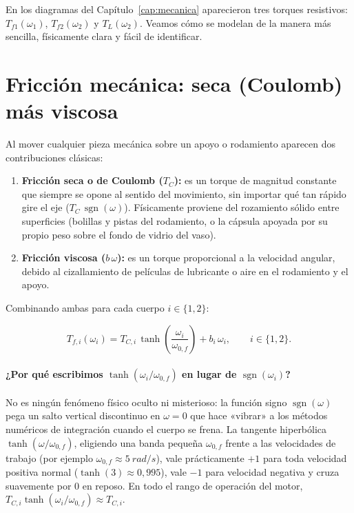 \documentclass[11pt,a4paper,oneside]{book}
\newcommand{\sgn}{\operatorname{sgn}}
\begin{document}
En los diagramas del Capítulo~\ref{cap:mecanica} aparecieron tres torques
resistivos: $T_{f1}(\omega_1)$, $T_{f2}(\omega_2)$ y $T_L(\omega_2)$. Veamos
cómo se modelan de la manera más sencilla, físicamente clara y fácil de
identificar.

\section{Fricción mecánica: seca (Coulomb) más viscosa}

Al mover cualquier pieza mecánica sobre un apoyo o rodamiento aparecen dos
contribuciones clásicas:
\begin{enumerate}
  \item \textbf{Fricción seca o de Coulomb ($T_C$):} es un torque de magnitud
        constante que siempre se opone al sentido del movimiento, sin importar
        qué tan rápido gire el eje ($T_C\,\sgn(\omega)$). Físicamente proviene
        del rozamiento sólido entre superficies (bolillas y pistas del
        rodamiento, o la cápsula apoyada por su propio peso sobre el fondo de
        vidrio del vaso).
  \item \textbf{Fricción viscosa ($b\,\omega$):} es un torque proporcional a la
        velocidad angular, debido al cizallamiento de películas de lubricante o
        aire en el rodamiento y el apoyo.
\end{enumerate}

Combinando ambas para cada cuerpo $i \in \{1, 2\}$:
\begin{ecuacionclave}
\begin{equation}
  T_{f,i}(\omega_i) = T_{C,i}\,\tanh\!\left(\frac{\omega_i}{\omega_{0,f}}\right) + b_i\,\omega_i,
  \qquad i \in \{1, 2\}.
  \label{eq:friccion_cap4}
\end{equation}
\end{ecuacionclave}

\paragraph{¿Por qué escribimos $\tanh(\omega_i/\omega_{0,f})$ en lugar de $\sgn(\omega_i)$?}
No es ningún fenómeno físico oculto ni misterioso: la función signo $\sgn(\omega)$
pega un salto vertical discontinuo en $\omega = 0$ que hace «vibrar» a los
métodos numéricos de integración cuando el cuerpo se frena. La tangente
hiperbólica $\tanh(\omega/\omega_{0,f})$, eligiendo una banda pequeña
$\omega_{0,f}$ frente a las velocidades de trabajo (por ejemplo
$\omega_{0,f} \approx \SI{5}{rad/s}$), vale prácticamente $+1$ para toda
velocidad positiva normal ($\tanh(3) \approx 0{,}995$), vale $-1$ para
velocidad negativa y cruza suavemente por $0$ en reposo. En todo el rango de
operación del motor, $T_{C,i}\tanh(\omega_i/\omega_{0,f}) \approx T_{C,i}$.
\end{document}
